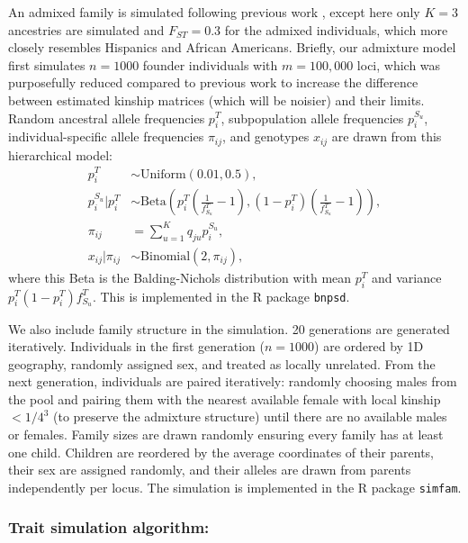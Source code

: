 \documentclass[9pt,twocolumn,twoside]{gsajnl}
\newcommand{\xij}[1][j]{x_{i#1}}
\newcommand{\pit}{p_i^T}
\newcommand{\ft}[1][j]{f_{#1}^T}
\begin{document}
An admixed family is simulated following previous work \citep{yao_limitations_2022}, except here only $K=3$ ancestries are simulated and $F_{ST}=0.3$ for the admixed individuals, which more closely resembles Hispanics and African Americans.
Briefly, our admixture model first simulates $n=1000$ founder individuals with $m=100,000$ loci, which was purposefully reduced compared to previous work to increase the difference between estimated kinship matrices (which will be noisier) and their limits.
Random ancestral allele frequencies $\pit$, subpopulation allele frequencies $p_i^{S_u}$, individual-specific allele frequencies $\pi_{ij}$, and genotypes $\xij$ are drawn from this hierarchical model:
\begin{align*}
  \pit
  &\sim
    \text{Uniform}( 0.01, 0.5 )
    , \\
  p_i^{S_u} | \pit
  &\sim
    \text{Beta} \left(
    \pit \left( \frac{1}{ \ft[S_u] } - 1 \right),
    \left( 1 - \pit \right) \left( \frac{1}{ \ft[S_u] } - 1 \right)
    \right)
    , \\
  \pi_{ij}
  &=
    \sum_{u = 1}^K q_{ju} p_i^{S_u}
    , \\
  \xij | \pi_{ij}
  &\sim
    \text{Binomial}(2, \pi_{ij})
    ,
\end{align*}
where this Beta is the Balding-Nichols distribution \citep{balding_method_1995} with mean $\pit$ and variance $\pit \left( 1 - \pit \right) \ft[S_u]$.
This is implemented in the R package \texttt{bnpsd}.

We also include family structure in the simulation.
20 generations are generated iteratively.
Individuals in the first generation ($n=1000$) are ordered by 1D geography, randomly assigned sex, and treated as locally unrelated. 
From the next generation, individuals are paired iteratively: randomly choosing males from the pool and pairing them with the nearest available female with local kinship $<1/4^3$ (to preserve the admixture structure) until there are no available males or females.
Family sizes are drawn randomly ensuring every family has at least one child.
Children are reordered by the average coordinates of their parents, their sex are assigned randomly, and their alleles are drawn from parents independently per locus.
The simulation is implemented in the R package \texttt{simfam}.

\subsubsection{Trait simulation algorithm:}
\end{document}

